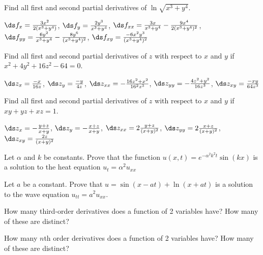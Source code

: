 \begin{enumialphparenastyle}
\begin{ex}
Find all first and second partial derivatives of
$\ln\sqrt{x^3+y^4}$.
\begin{sol}
$\ds f_x={3x^2\over2(x^3+y^4)}$, 
$\ds f_y={2y^3\over x^3+y^4}$,
$\ds f_{xx}={3x\over x^3+y^4}-{9x^4\over 2(x^3+y^4)^2}$, 
$\ds f_{yy}={6y^2\over x^3+y^4}-{8y^6\over (x^3+y^4)^2}$,\hfill\break 
$\ds f_{xy}={-6x^2y^3\over (x^3+y^4)^2}$
\end{sol}
\end{ex}

\begin{ex}
Find all first and second partial derivatives of
$z$ with respect to $x$ and $y$ if 
$x^2+4y^2+16z^2-64=0$.
\begin{sol}
$\ds z_x={-x\over16z}$, 
$\ds z_y={-y\over4z}$,\hfill\break 
$\ds z_{xx}=-{16z^2+x^2\over16^2z^3}$,\hfill\break 
$\ds z_{yy}=-{4z^2+y^2\over16z^3}$,\hfill\break 
$\ds z_{xy}={-xy\over64z^3}$
\end{sol}
\end{ex}

\begin{ex}
Find all first and second partial derivatives of
$z$ with respect to $x$ and $y$ if 
$xy+yz+xz=1$.
\begin{sol}
$\ds z_x=-{y+z\over x+y}$, 
$\ds z_y=-{x+z\over x+y}$,\hfill\break 
$\ds z_{xx}=2{y+z\over(x+y)^2}$, 
$\ds z_{yy}=2{x+z\over(x+y)^2}$,\hfill\break 
$\ds z_{xy}={2z\over(x+y)^2}$
\end{sol}
\end{ex}

\begin{ex}
Let $\alpha$ and $k$ be constants.  Prove that the function 
$u(x,t)=e^{-\alpha^2k^2t}\sin(kx)$
is a solution to the heat equation $u_t=\alpha^2u_{xx}$
\end{ex}

\begin{ex}
Let $a$ be a constant.  Prove that $u=\sin(x-at)+\ln(x+at)$ is
  a solution to the wave equation $u_{tt}=a^2u_{xx}$.

\end{ex}

\begin{ex}
How many third-order derivatives does a function of 2 variables
  have?  How many of these are distinct?
\end{ex}

\begin{ex}
How many $n$th order derivatives does a function of 2 variables
  have?  How many of these are distinct?
\end{ex}

\end{enumialphparenastyle}
